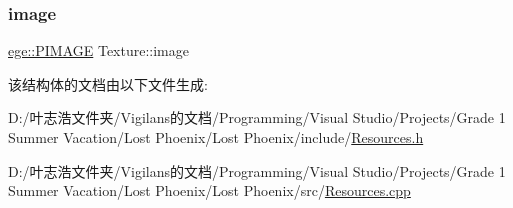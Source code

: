 \mbox{\label{struct_texture_ac4b0ce38664ca13285a077c12277e753}} 
\subsubsection{\texorpdfstring{image}{image}}
{\footnotesize\ttfamily \hyperlink{namespaceege_a72e07306fee47bc08f1baf842cb681fb}{ege\+::\+P\+I\+M\+A\+GE} Texture\+::image}



该结构体的文档由以下文件生成\+:\begin{DoxyCompactItemize}
\item 
D\+:/叶志浩文件夹/\+Vigilans的文档/\+Programming/\+Visual Studio/\+Projects/\+Grade 1 Summer Vacation/\+Lost Phoenix/\+Lost Phoenix/include/\hyperlink{_resources_8h}{Resources.\+h}\item 
D\+:/叶志浩文件夹/\+Vigilans的文档/\+Programming/\+Visual Studio/\+Projects/\+Grade 1 Summer Vacation/\+Lost Phoenix/\+Lost Phoenix/src/\hyperlink{_resources_8cpp}{Resources.\+cpp}\end{DoxyCompactItemize}
